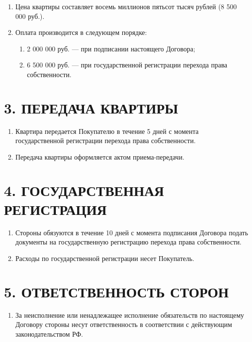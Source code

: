 \documentclass[12pt,a4paper]{article}
\begin{document}
\begin{enumerate}
\item Цена квартиры составляет восемь миллионов пятьсот тысяч рублей (8 500 000 руб.).

\item Оплата производится в следующем порядке:
\begin{enumerate}
\item 2 000 000 руб. — при подписании настоящего Договора;
\item 6 500 000 руб. — при государственной регистрации перехода права собственности.
\end{enumerate}
\end{enumerate}

\section*{3. ПЕРЕДАЧА КВАРТИРЫ}

\begin{enumerate}
\item Квартира передается Покупателю в течение 5 дней с момента государственной регистрации перехода права собственности.

\item Передача квартиры оформляется актом приема-передачи.
\end{enumerate}

\section*{4. ГОСУДАРСТВЕННАЯ РЕГИСТРАЦИЯ}

\begin{enumerate}
\item Стороны обязуются в течение 10 дней с момента подписания Договора подать документы на государственную регистрацию перехода права собственности.

\item Расходы по государственной регистрации несет Покупатель.
\end{enumerate}

\section*{5. ОТВЕТСТВЕННОСТЬ СТОРОН}

\begin{enumerate}
\item За неисполнение или ненадлежащее исполнение обязательств по настоящему Договору стороны несут ответственность в соответствии с действующим законодательством РФ.
\end{enumerate}
\end{document}
